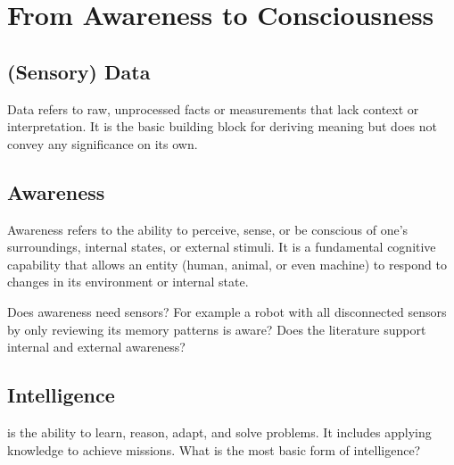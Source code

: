\chapter{From Awareness to Consciousness}
\section{(Sensory) Data} Data refers to raw, unprocessed facts or measurements that lack context or interpretation. It is the basic building block for deriving meaning but does not convey any significance on its own.

\section{Awareness}
Awareness refers to the ability to perceive, sense, or be conscious of one’s surroundings, internal states, or external stimuli. It is a fundamental cognitive capability that allows an entity (human, animal, or even machine) to respond to changes in its environment or internal state.

Does awareness need sensors? For example a robot with all disconnected sensors by only reviewing its memory patterns is aware? Does the literature support internal and external awareness?




\section{Intelligence}  is the ability to learn, reason, adapt, and solve problems. It includes applying knowledge to achieve missions. What is the most basic form of intelligence?



